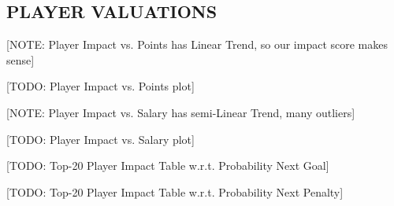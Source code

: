\documentclass[]{article}
\begin{document}
%

\subsection{PLAYER VALUATIONS}

[NOTE: Player Impact vs. Points has Linear Trend, so our impact score makes sense]

[TODO: Player Impact vs. Points plot]

[NOTE: Player Impact vs. Salary has semi-Linear Trend, many outliers]

[TODO: Player Impact vs. Salary plot]

[TODO: Top-20 Player Impact Table w.r.t. Probability Next Goal]

[TODO: Top-20 Player Impact Table w.r.t. Probability Next Penalty]
\end{document}
